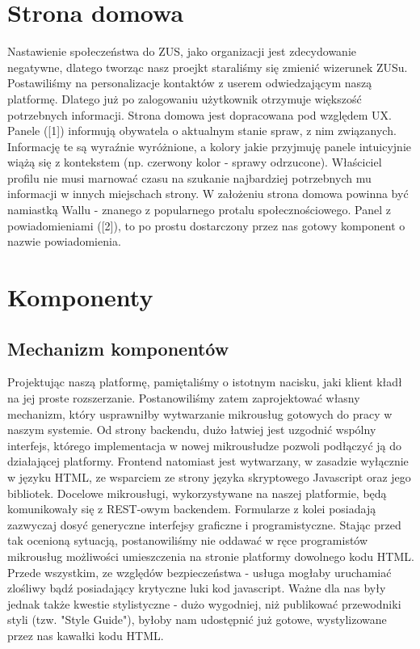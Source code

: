 \documentclass[licencjacka]{pracamgr}
\begin{document}
\section{Strona domowa}
Nastawienie społeczeństwa do ZUS, jako organizacji jest zdecydowanie negatywne, dlatego tworząc nasz proejkt staraliśmy się
zmienić wizerunek ZUSu. Postawiliśmy na personalizacje kontaktów z userem odwiedzającym naszą platformę. Dlatego już po zalogowaniu
użytkownik otrzymuje większość potrzebnych informacji. Strona domowa jest dopracowana pod względem UX. Panele ([1]) informują
obywatela o aktualnym stanie spraw, z nim związanych. Informację te są wyraźnie wyróżnione, a kolory jakie przyjmuję panele
intuicyjnie wiążą się z kontekstem (np. czerwony kolor - sprawy odrzucone). Właściciel profilu nie musi marnować czasu
na szukanie najbardziej potrzebnych mu informacji w innych miejschach strony. W założeniu strona domowa powinna być
namiastką Wallu - znanego z popularnego protalu społecznościowego. Panel z powiadomieniami ([2]), to po prostu dostarczony
przez nas gotowy komponent o nazwie powiadomienia.

\section{Komponenty}
\subsection{Mechanizm komponentów}

Projektując naszą platformę, pamiętaliśmy o istotnym nacisku, jaki klient kładł na jej proste rozszerzanie.
Postanowiliśmy zatem zaprojektować własny mechanizm, który usprawniłby wytwarzanie mikrousług gotowych do pracy w naszym systemie.
Od strony backendu, dużo łatwiej jest uzgodnić wspólny interfejs, którego implementacja w nowej mikrousłudze pozwoli podłączyć ją do działającej platformy.
Frontend natomiast jest wytwarzany, w zasadzie wyłącznie w języku HTML, ze wsparciem ze strony języka skryptowego Javascript oraz jego bibliotek.
Docelowe mikrousługi, wykorzystywane na naszej platformie, będą komunikowały się z REST-owym backendem.
Formularze z kolei posiadają zazwyczaj dosyć generyczne interfejsy graficzne i programistyczne.
Stając przed tak ocenioną sytuacją, postanowiliśmy nie oddawać w ręce programistów mikrousług możliwości umieszczenia na stronie platformy dowolnego kodu HTML.
Przede wszystkim, ze względów bezpieczeństwa - usługa mogłaby uruchamiać zlośliwy bądź posiadający krytyczne luki kod javascript.
Ważne dla nas były jednak także kwestie stylistyczne - dużo wygodniej, niż publikować przewodniki styli (tzw. "Style Guide"),
byłoby nam udostępnić już gotowe, wystylizowane przez nas kawałki kodu HTML.
\end{document}
